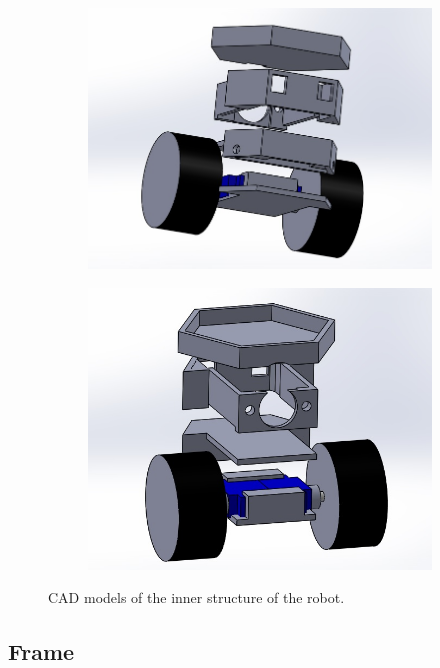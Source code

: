 \documentclass[a4paper,twoside]{book}
\begin{document}
\begin{figure}[b]
 
\begin{subfigure}{0.5\textwidth}
\includegraphics[width=0.9\linewidth]{img/VistaAssieme1} 
\end{subfigure}
\begin{subfigure}{0.5\textwidth}
\includegraphics[width=0.9\linewidth]{img/VistaAssieme2}
\end{subfigure}
 
\caption{CAD models of the inner structure of the robot.}
\end{figure}

\subsection{Frame}
\end{document}
